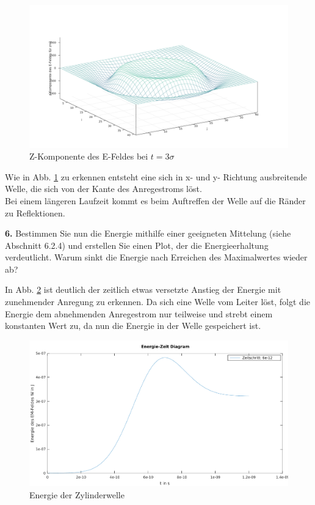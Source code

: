 \documentclass[Protokollheft.tex]{subfiles}
\begin{document}
\begin{figure}[h]
	\centering
	\includegraphics[width=0.7\linewidth]{Welle}
	\caption{Z-Komponente des E-Feldes bei $t= 3\sigma$}
	\label{fig:welle}
\end{figure}
\noindent
Wie in Abb. \ref{fig:welle} zu erkennen entsteht eine sich in x- und y- Richtung ausbreitende Welle, die sich von der Kante des Anregestroms löst.\\
Bei einem längeren Laufzeit kommt es beim Auftreffen der Welle auf die Ränder zu Reflektionen.

\begin{framed}
	\noindent \textbf{6.} Bestimmen Sie nun die Energie mithilfe einer geeigneten Mittelung (siehe Abschnitt 6.2.4) und erstellen Sie einen Plot, der die Energieerhaltung verdeutlicht. Warum sinkt die Energie nach Erreichen des Maximalwertes wieder ab?\label{exer:energyConservation}
\end{framed}
\noindent
In Abb. \ref{fig:enegiedesfeldes} ist deutlich der zeitlich etwas versetzte Anstieg der Energie mit zunehmender Anregung zu erkennen. Da sich eine Welle vom Leiter löst, folgt die Energie dem abnehmenden Anregestrom nur teilweise und strebt einem konstanten Wert zu, da nun die Energie in der Welle gespeichert ist.
\begin{figure}[h]
	\centering
	\includegraphics[width=0.7\linewidth]{EnegiedesFeldes}
	\caption{Energie der Zylinderwelle}
	\label{fig:enegiedesfeldes}
\end{figure}
\end{document}
